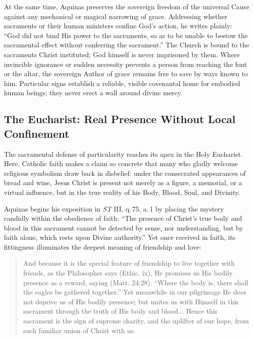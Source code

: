 At the same time, Aquinas preserves the sovereign freedom of the universal Cause against any mechanical or magical narrowing of grace. Addressing whether sacraments or their human ministers confine God's action, he writes plainly: ``God did not bind His power to the sacraments, so as to be unable to bestow the sacramental effect without conferring the sacrament.'' The Church is bound to the sacraments Christ instituted; God himself is never imprisoned by them. Where invincible ignorance or sudden necessity prevents a person from reaching the font or the altar, the sovereign Author of grace remains free to save by ways known to him. Particular signs establish a reliable, visible covenantal home for embodied human beings; they never erect a wall around divine mercy.

\subsection{The Eucharist: Real Presence Without Local Confinement}

The sacramental defense of particularity reaches its apex in the Holy Eucharist. Here, Catholic faith makes a claim so concrete that many who gladly welcome religious symbolism draw back in disbelief: under the consecrated appearances of bread and wine, Jesus Christ is present not merely as a figure, a memorial, or a virtual influence, but in the true reality of his Body, Blood, Soul, and Divinity.

Aquinas begins his exposition in \textit{ST} III, q.\,75, a.\,1 by placing the mystery candidly within the obedience of faith: ``The presence of Christ's true body and blood in this sacrament cannot be detected by sense, nor understanding, but by faith alone, which rests upon Divine authority.'' Yet once received in faith, its fittingness illuminates the deepest meaning of friendship and love:

\begin{quote}
And because it is the special feature of friendship to live together with friends, as the Philosopher says (Ethic. ix), He promises us His bodily presence as a reward, saying (Matt. 24:28): ``Where the body is, there shall the eagles be gathered together.'' Yet meanwhile in our pilgrimage He does not deprive us of His bodily presence; but unites us with Himself in this sacrament through the truth of His body and blood... Hence this sacrament is the sign of supreme charity, and the uplifter of our hope, from such familiar union of Christ with us.
\end{quote}

